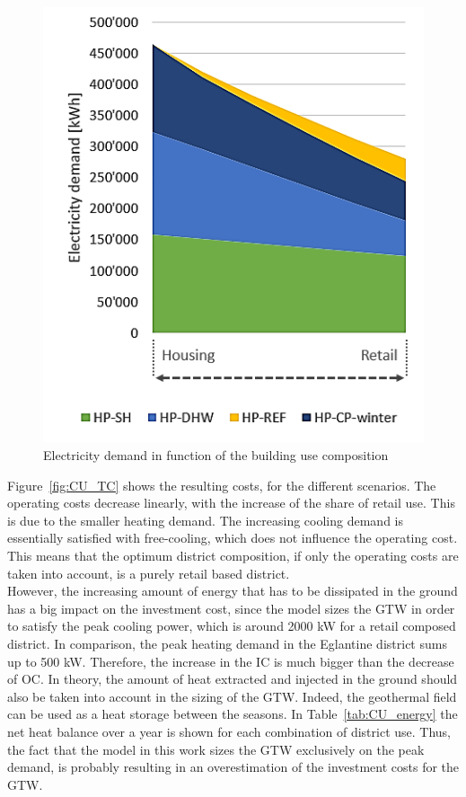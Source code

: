 \documentclass{article}
\begin{document}
\begin{figure}[tph]
	\centering
	\includegraphics[width=0.55\linewidth]{Images/CU_el}
	\caption{Electricity demand in function of the building use composition}
	\label{fig:CU_el}
\end{figure}

Figure~\ref{fig:CU_TC} shows the resulting costs, for the different scenarios. The operating costs decrease linearly, with the increase of the share of retail use. This is due to the smaller heating demand. The increasing cooling demand is essentially satisfied with free-cooling, which does not influence the operating cost. This means that the optimum district composition, if only the operating costs are taken into account, is a purely retail based district.\\

However, the increasing amount of energy that has to be dissipated in the ground has a big impact on the investment cost, since the model sizes the GTW in order to satisfy the peak cooling power, which is around 2000 kW for a retail composed district. In comparison, the peak heating demand in the Eglantine district sums up to 500 kW. Therefore, the increase in the IC is much bigger than the decrease of OC. In theory, the amount of heat extracted and injected in the ground should also be taken into account in the sizing of the GTW. Indeed, the geothermal field can be used as a heat storage between the seasons. In Table~\ref{tab:CU_energy} the net heat balance over a year is shown for each combination of district use. Thus, the fact that the model in this work sizes the GTW exclusively on the peak demand, is probably resulting in an overestimation of the investment costs for the GTW.
\end{document}
